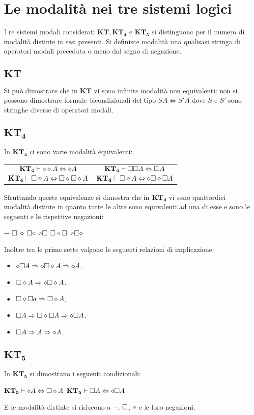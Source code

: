 \section{Le modalit\`a nei tre sistemi logici}
I re sistemi modali considerati $\mathbf{KT}, \mathbf{KT_4}$ e $\mathbf{KT_5}$ si distinguono per il numero di modalit\`a distinte in essi presenti. Si definisce modalit\`a una qualisasi stringa di operatori 
modali preceduta o meno dal segno di negazione. 
\subsection{$\mathbf{KT}$}
Si pu\`o dimostrare che in $\mathbf{KT}$ vi sono infinite modalit\`a non equivalenti: non si possono dimostrare formule bicondizionali del tipo $SA\Leftrightarrow S'A$ dove $S$ e $S'$ sono stringhe diverse 
di operatori modali.
\subsection{$\mathbf{KT_4}$}
In $\mathbf{KT_4}$ ci sono varie modalit\`a equivalenti:
\begin{center}
\begin{tabular}{c c}
$\mathbf{KT_4}\vdash\diamond\diamond A\Leftrightarrow\diamond A$ & $\mathbf{KT_4}\vdash\Box\Box A\Leftrightarrow\Box A$\\
$\mathbf{KT_4}\vdash\Box\diamond A\Leftrightarrow\Box\diamond\Box\diamond A$ & $\mathbf{KT_4}\vdash\Box\diamond A\Leftrightarrow\diamond\Box\diamond\Box A$
\end{tabular}
\end{center}
Sfruttando queste equivalenze si dimostra che in $\mathbf{KT_4}$ vi sono quattordici modalit\`a distinte in quanto tutte le altre sono equivalenti ad una di esse e sono le seguenti e le rispettive negazioni:
\begin{center}
$-$ \quad $\Box$ \quad $\diamond$ \quad $\Box\diamond$ \quad $\diamond\Box$ \quad $\Box\diamond\Box$ \quad $\diamond\Box\diamond$
\end{center}
Inoltre tra le prime sette valgono le seguenti relazioni di implicazione:
\begin{itemize}
\item $\diamond\Box A\Rightarrow \diamond\Box\diamond A\Rightarrow\diamond A$.
\item $\Box\diamond A\Rightarrow\diamond\Box\diamond A$.
\item $\Box\diamond\Box a\Rightarrow\Box\diamond A$,
\item $\Box A\Rightarrow\Box\diamond\Box A\Rightarrow\diamond\Box A$.
\item $\Box A\Rightarrow A\Rightarrow \diamond A$.
\end{itemize}
\subsection{$\mathbf{KT_5}$}
In $\mathbf{KT_5}$ si dimostrano i seguenti condizionali:
\begin{center}
$\mathbf{KT_5}\vdash\diamond A\Leftrightarrow\Box\diamond A$ \quad $\mathbf{KT_5}\vdash\Box A\Leftrightarrow\diamond\Box A$
\end{center}
E le modalit\`a distinte si riducono a $-$, $\Box$, $\diamond$ e le loro negazioni.